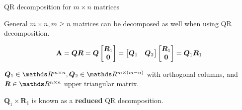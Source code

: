 \documentclass[11pt,compress,t,notes=noshow, xcolor=table]{beamer}
\begin{document}
\begin{vbframe}{QR decomposition for $m \times n$ matrices}

General $m \times n, m \ge n$ matrices can be decomposed as well when using QR decomposition.

$$
\mathbf{A} = \bm{QR} = \bm{Q} \begin{bmatrix} \bm{R}_1 \\ \mathbf{0} \end{bmatrix} = \begin{bmatrix} \bm{Q}_1 & \bm{Q}_2 \end{bmatrix} \begin{bmatrix} \bm{R}_1 \\ \mathbf{0} \end{bmatrix} = \bm{Q}_1 \bm{R}_1
$$

$\bm{Q}_1 \in \R^{m \times n}, \bm{Q}_2 \in \R^{m\times(m-n)}$ with orthogonal columns, and $\bm{R} \in \R^{n \times n}$ upper triangular matrix.

\lz

$\bm{Q}_1 \times \bm{R}_1$ is known as a \textbf{reduced} QR decomposition.

\end{vbframe}


\endlecture
\end{document}
